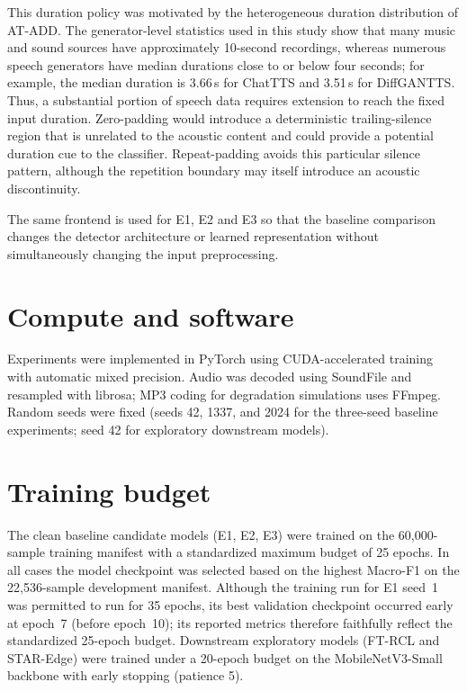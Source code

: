 \documentclass[12pt,a4paper]{report}
\begin{document}
This duration policy was motivated by the heterogeneous duration distribution of AT-ADD. The generator-level statistics used in this study show that many music and sound sources have approximately 10-second recordings, whereas numerous speech generators have median durations close to or below four seconds; for example, the median duration is 3.66\,s for ChatTTS and 3.51\,s for DiffGANTTS. Thus, a substantial portion of speech data requires extension to reach the fixed input duration. Zero-padding would introduce a deterministic trailing-silence region that is unrelated to the acoustic content and could provide a potential duration cue to the classifier. Repeat-padding avoids this particular silence pattern, although the repetition boundary may itself introduce an acoustic discontinuity.

The same frontend is used for E1, E2 and E3 so that the baseline comparison changes the detector architecture or learned representation without simultaneously changing the input preprocessing.

\section{Compute and software}
\label{sec:compute}

Experiments were implemented in PyTorch using CUDA-accelerated training with automatic mixed precision. Audio was decoded using SoundFile and resampled with librosa; MP3 coding for degradation simulations uses FFmpeg. Random seeds were fixed (seeds 42, 1337, and 2024 for the three-seed baseline experiments; seed 42 for exploratory downstream models).

\section{Training budget}
\label{sec:budget}

The clean baseline candidate models (E1, E2, E3) were trained on the 60{,}000-sample training manifest with a standardized maximum budget of 25 epochs. In all cases the model checkpoint was selected based on the highest Macro-F1 on the 22{,}536-sample development manifest. Although the training run for E1 seed~1 was permitted to run for 35 epochs, its best validation checkpoint occurred early at epoch~7 (before epoch~10); its reported metrics therefore faithfully reflect the standardized 25-epoch budget. Downstream exploratory models (FT-RCL and STAR-Edge) were trained under a 20-epoch budget on the MobileNetV3-Small backbone with early stopping (patience 5).
\end{document}
